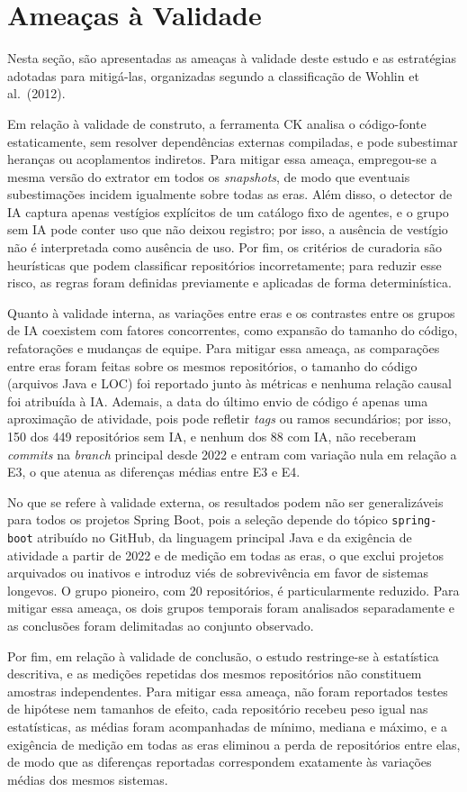 \section{Ameaças à Validade}
\label{sec:ameacas}

Nesta seção, são apresentadas as ameaças à validade deste estudo e as estratégias adotadas para mitigá-las, organizadas segundo a classificação de Wohlin et al.\ (2012)\nocite{wohlin:2012}.

Em relação à validade de construto, a ferramenta CK analisa o código-fonte estaticamente, sem resolver dependências externas compiladas, e pode subestimar heranças ou acoplamentos indiretos. Para mitigar essa ameaça, empregou-se a mesma versão do extrator em todos os \emph{snapshots}, de modo que eventuais subestimações incidem igualmente sobre todas as eras. Além disso, o detector de IA captura apenas vestígios explícitos de um catálogo fixo de agentes, e o grupo sem IA pode conter uso que não deixou registro; por isso, a ausência de vestígio não é interpretada como ausência de uso. Por fim, os critérios de curadoria são heurísticas que podem classificar repositórios incorretamente; para reduzir esse risco, as regras foram definidas previamente e aplicadas de forma determinística.

Quanto à validade interna, as variações entre eras e os contrastes entre os grupos de IA coexistem com fatores concorrentes, como expansão do tamanho do código, refatorações e mudanças de equipe. Para mitigar essa ameaça, as comparações entre eras foram feitas sobre os mesmos repositórios, o tamanho do código (arquivos Java e LOC) foi reportado junto às métricas e nenhuma relação causal foi atribuída à IA. Ademais, a data do último envio de código é apenas uma aproximação de atividade, pois pode refletir \emph{tags} ou ramos secundários; por isso, 150 dos 449 repositórios sem IA, e nenhum dos 88 com IA, não receberam \emph{commits} na \emph{branch} principal desde 2022 e entram com variação nula em relação a E3, o que atenua as diferenças médias entre E3 e E4.

No que se refere à validade externa, os resultados podem não ser generalizáveis para todos os projetos Spring Boot, pois a seleção depende do tópico \texttt{spring-boot} atribuído no GitHub, da linguagem principal Java e da exigência de atividade a partir de 2022 e de medição em todas as eras, o que exclui projetos arquivados ou inativos e introduz viés de sobrevivência em favor de sistemas longevos. O grupo pioneiro, com 20 repositórios, é particularmente reduzido. Para mitigar essa ameaça, os dois grupos temporais foram analisados separadamente e as conclusões foram delimitadas ao conjunto observado.

Por fim, em relação à validade de conclusão, o estudo restringe-se à estatística descritiva, e as medições repetidas dos mesmos repositórios não constituem amostras independentes. Para mitigar essa ameaça, não foram reportados testes de hipótese nem tamanhos de efeito, cada repositório recebeu peso igual nas estatísticas, as médias foram acompanhadas de mínimo, mediana e máximo, e a exigência de medição em todas as eras eliminou a perda de repositórios entre elas, de modo que as diferenças reportadas correspondem exatamente às variações médias dos mesmos sistemas.
